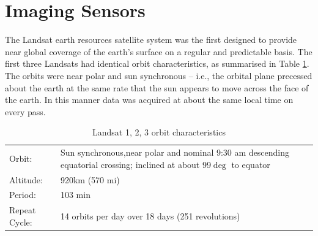 \documentclass[document.tex]{subfiles}
\begin{document}
\section{Imaging Sensors}
The Landsat earth resources satellite system was the first designed to provide near
global coverage of the earth’s surface on a regular and predictable basis.
The first three Landsats had identical orbit characteristics, as summarised in
Table \ref{tab:Landsat 1, 2, 3 orbit characteristics}. The orbits were near polar and sun synchronous – i.e., the orbital plane
precessed about the earth at the same rate that the sun appears to move across the
face of the earth. In this manner data was acquired at about the same local time on
every pass.
\begin{table}[H]
	\caption{Landsat 1, 2, 3 orbit characteristics}
	\begin{center}
		\begin{tabularx}{\columnwidth}{|XX|}
			\hline Orbit: & Sun synchronous,near polar and nominal 9:30 am descending equatorial crossing; inclined at about 99$\deg$ to equator\\
			Altitude: & 920km (570 mi)\\
			Period: & 103 min\\
			Repeat Cycle: & 14 orbits per day over 18 days (251 revolutions)\\\hline
		\end{tabularx}
	\end{center}
	\label{tab:Landsat 1, 2, 3 orbit characteristics}
\end{table}
\end{document}
